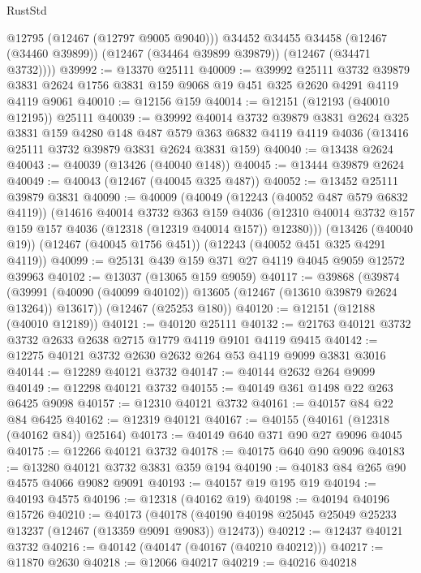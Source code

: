 \begin{lexlean}{RustStd}
\begin{coremodule}
          @12795
          (@12467 (@12797 @9005 @9040)))
        @34452
        @34455
        @34458
        (@12467 (@34460 @39899))
        (@12467 (@34464 @39899 @39879))
        (@12467 (@34471 @3732))))
@39992 := @13370 @25111
@40009 := @39992
    @25111
    @3732
    @39879
    @3831
    @2624
    @1756
    @3831
    @159
    @9068
    @19
    @451
    @325
    @2620
    @4291
    @4119
    @4119
    @9061
@40010 := @12156 @159
@40014 := @12151 (@12193 (@40010 @12195)) @25111
@40039 := @39992
    @40014
    @3732
    @39879
    @3831
    @2624
    @325
    @3831
    @159
    @4280
    @148
    @487
    @579
    @363
    @6832
    @4119
    @4119
    @4036
    (@13416 @25111 @3732 @39879 @3831 @2624 @3831 @159)
@40040 := @13438 @2624
@40043 := @40039 (@13426 (@40040 @148))
@40045 := @13444 @39879 @2624
@40049 := @40043 (@12467 (@40045 @325 @487))
@40052 := @13452 @25111 @39879 @3831
@40090 := @40009
    (@40049
      (@12243 (@40052 @487 @579 @6832 @4119))
      (@14616
        @40014
        @3732
        @363
        @159
        @4036
        (@12310 @40014 @3732 @157 @159 @157 @4036 (@12318 (@12319 @40014 @157)) @12380)))
    (@13426 (@40040 @19))
    (@12467 (@40045 @1756 @451))
    (@12243 (@40052 @451 @325 @4291 @4119))
@40099 := @25131 @439 @159 @371 @27 @4119 @4045 @9059 @12572 @39963
@40102 := @13037 (@13065 @159 @9059)
@40117 := @39868
    (@39874 (@39991 (@40090 (@40099 @40102)) @13605 (@12467 (@13610 @39879 @2624 @13264)) @13617))
    (@12467 (@25253 @180))
@40120 := @12151 (@12188 (@40010 @12189))
@40121 := @40120 @25111
@40132 := @21763 @40121 @3732 @3732 @2633 @2638 @2715 @1779 @4119 @9101 @4119 @9415
@40142 := @12275 @40121 @3732 @2630 @2632 @264 @53 @4119 @9099 @3831 @3016
@40144 := @12289 @40121 @3732
@40147 := @40144 @2632 @264 @9099
@40149 := @12298 @40121 @3732
@40155 := @40149 @361 @1498 @22 @263 @6425 @9098
@40157 := @12310 @40121 @3732
@40161 := @40157 @84 @22 @84 @6425
@40162 := @12319 @40121
@40167 := @40155 (@40161 (@12318 (@40162 @84)) @25164)
@40173 := @40149 @640 @371 @90 @27 @9096 @4045
@40175 := @12266 @40121 @3732
@40178 := @40175 @640 @90 @9096
@40183 := @13280 @40121 @3732 @3831 @359 @194
@40190 := @40183 @84 @265 @90 @4575 @4066 @9082 @9091
@40193 := @40157 @19 @195 @19
@40194 := @40193 @4575
@40196 := @12318 (@40162 @19)
@40198 := @40194 @40196 @15726
@40210 := @40173
    (@40178 (@40190 @40198 @25045 @25049 @25233 @13237 (@12467 (@13359 @9091 @9083)) @12473))
@40212 := @12437 @40121 @3732
@40216 := @40142 (@40147 (@40167 (@40210 @40212)))
@40217 := @11870 @2630
@40218 := @12066 @40217
@40219 := @40216 @40218

\end{coremodule}
\end{lexlean}
